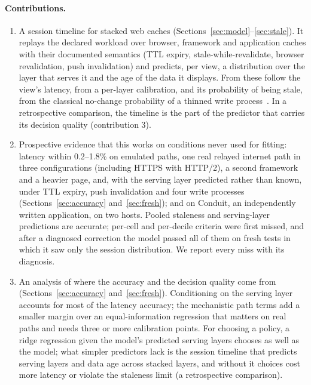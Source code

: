 \documentclass[acmsmall,review,nonacm]{acmart}
\begin{document}
\paragraph{Contributions.}
\begin{enumerate}
\item A session timeline for stacked web caches (Sections~\ref{sec:model}--\ref{sec:stale}). It replays the declared workload over browser, framework and application caches with their documented semantics (TTL expiry, stale-while-revalidate, browser revalidation, push invalidation) and predicts, per view, a distribution over the layer that serves it and the age of the data it displays. From these follow the view's latency, from a per-layer calibration, and its probability of being stale, from the classical no-change probability of a thinned write process~\cite{cho2000freshness,gessert2017quaestor}. In a retrospective comparison, the timeline is the part of the predictor that carries its decision quality (contribution 3).
\item Prospective evidence that this works on conditions never used for fitting: latency within 0.2--1.8\% on emulated paths, one real relayed internet path in three configurations (including HTTPS with HTTP/2), a second framework and a heavier page, and, with the serving layer predicted rather than known, under TTL expiry, push invalidation and four write processes (Sections~\ref{sec:accuracy} and~\ref{sec:fresh}); and on Conduit, an independently written application, on two hosts. Pooled staleness and serving-layer predictions are accurate; per-cell and per-decile criteria were first missed, and after a diagnosed correction the model passed all of them on fresh tests in which it saw only the session distribution. We report every miss with its diagnosis.
\item An analysis of where the accuracy and the decision quality come from (Sections~\ref{sec:accuracy} and~\ref{sec:fresh}). Conditioning on the serving layer accounts for most of the latency accuracy; the mechanistic path terms add a smaller margin over an equal-information regression that matters on real paths and needs three or more calibration points. For choosing a policy, a ridge regression given the model's predicted serving layers chooses as well as the model; what simpler predictors lack is the session timeline that predicts serving layers and data age across stacked layers, and without it choices cost more latency or violate the staleness limit (a retrospective comparison).

\end{enumerate}
\end{document}
